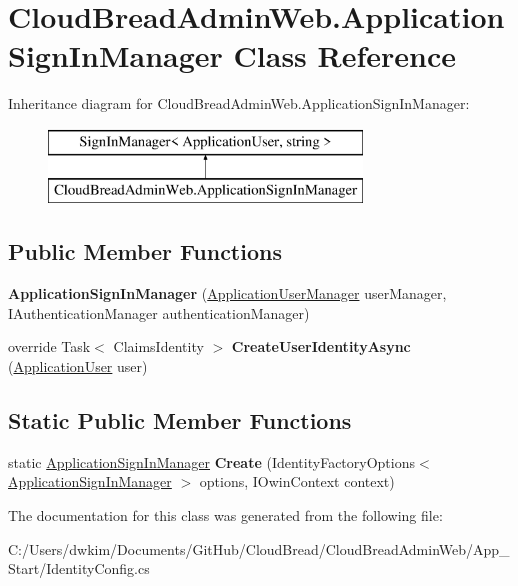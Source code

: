 \hypertarget{a00017}{}\section{Cloud\+Bread\+Admin\+Web.\+Application\+Sign\+In\+Manager Class Reference}
\label{a00017}
Inheritance diagram for Cloud\+Bread\+Admin\+Web.\+Application\+Sign\+In\+Manager\+:\begin{figure}[H]
\begin{center}
\leavevmode
\includegraphics[height=2.000000cm]{a00017}
\end{center}
\end{figure}
\subsection*{Public Member Functions}
\begin{DoxyCompactItemize}
\item 
{\bfseries Application\+Sign\+In\+Manager} (\hyperlink{a00019}{Application\+User\+Manager} user\+Manager, I\+Authentication\+Manager authentication\+Manager)\hypertarget{a00017_a2123b819dffedb29dbcd98a178dd12b5}{}\label{a00017_a2123b819dffedb29dbcd98a178dd12b5}

\item 
override Task$<$ Claims\+Identity $>$ {\bfseries Create\+User\+Identity\+Async} (\hyperlink{a00018}{Application\+User} user)\hypertarget{a00017_aa54573a171c3e9e11f973b8e4ef01485}{}\label{a00017_aa54573a171c3e9e11f973b8e4ef01485}

\end{DoxyCompactItemize}
\subsection*{Static Public Member Functions}
\begin{DoxyCompactItemize}
\item 
static \hyperlink{a00017}{Application\+Sign\+In\+Manager} {\bfseries Create} (Identity\+Factory\+Options$<$ \hyperlink{a00017}{Application\+Sign\+In\+Manager} $>$ options, I\+Owin\+Context context)\hypertarget{a00017_abf1f7666bdcdbc0fe090e1f5e873c88e}{}\label{a00017_abf1f7666bdcdbc0fe090e1f5e873c88e}

\end{DoxyCompactItemize}


The documentation for this class was generated from the following file\+:\begin{DoxyCompactItemize}
\item 
C\+:/\+Users/dwkim/\+Documents/\+Git\+Hub/\+Cloud\+Bread/\+Cloud\+Bread\+Admin\+Web/\+App\+\_\+\+Start/Identity\+Config.\+cs\end{DoxyCompactItemize}
